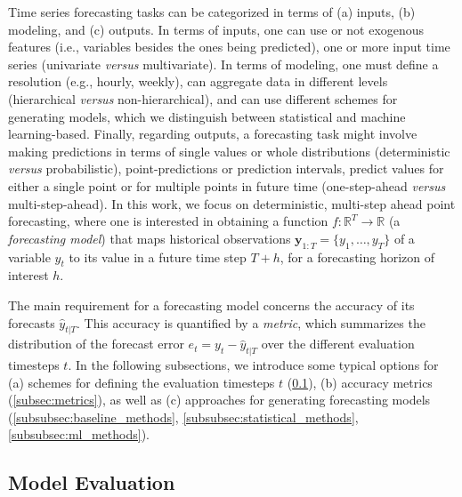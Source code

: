 Time series forecasting tasks can be categorized in terms of (a) inputs, (b) modeling, and (c) outputs.
In terms of inputs, one can use or not exogenous features (i.e., variables besides the ones being predicted), one or more input time series (univariate \textit{versus} multivariate). In terms of modeling, one must define a resolution (e.g., hourly, weekly), can aggregate data in different levels (hierarchical \textit{versus} non-hierarchical), and can use different schemes for generating models, which we distinguish between statistical and machine learning-based.
Finally, regarding outputs, a forecasting task might involve making predictions in terms of single values or whole distributions (deterministic \textit{versus} probabilistic), point-predictions or prediction intervals, predict values for either a single point or for multiple points in future time (one-step-ahead \textit{versus} multi-step-ahead).
In this work, we focus on deterministic, multi-step ahead point forecasting, where one is interested in obtaining a function $f: \mathbb{R}^T \rightarrow \mathbb{R}$ (a \textit{forecasting model}) that maps historical observations  $\boldsymbol{y} _{1:T} = \{y_1,…,y_T\}$ of a variable $y_t$ to its value in a future time step $T+h$, for a forecasting horizon of interest $h$.

The main requirement for a forecasting model concerns the accuracy of its forecasts $\hat{y}_{t|T}$. This accuracy is quantified by a \textit{metric}, which summarizes the distribution of the forecast error $e_{t} = y_{t} - \hat{y}_{t|T}$ over the different evaluation timesteps $t$. In the following subsections, we introduce some typical options for (a) schemes for defining the evaluation timesteps $t$ (\ref{subsec:model_evaluation}), (b) accuracy metrics (\ref{subsec:metrics}), as well as (c) approaches for generating  forecasting models (\ref{subsubsec:baseline_methods}, \ref{subsubsec:statistical_methods}, \ref{subsubsec:ml_methods}).

\subsection{Model Evaluation}\label{subsec:model_evaluation}

